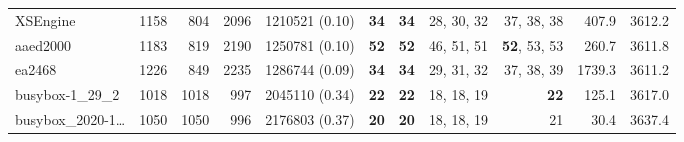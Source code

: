 \begin{table*}
\begin{tiny}
{{\begin{tabular}{lrrrrrrrrrr}
XSEngine & \num[text-series-to-math=true]{1158} & \num[text-series-to-math=true]{804} & \num[text-series-to-math=true]{2096} & \num[text-series-to-math=true]{1210521} (\num[text-series-to-math=true]{0.10}) & \textbf{\num[text-series-to-math=true]{34}} & \textbf{\num[text-series-to-math=true]{34}} & \num[text-series-to-math=true]{28}, \num[text-series-to-math=true]{30}, \num[text-series-to-math=true]{32} & \num[text-series-to-math=true]{37}, \num[text-series-to-math=true]{38}, \num[text-series-to-math=true]{38} & 407.9 & 3612.2\\
aaed2000 & \num[text-series-to-math=true]{1183} & \num[text-series-to-math=true]{819} & \num[text-series-to-math=true]{2190} & \num[text-series-to-math=true]{1250781} (\num[text-series-to-math=true]{0.10}) & \textbf{\num[text-series-to-math=true]{52}} & \textbf{\num[text-series-to-math=true]{52}} & \num[text-series-to-math=true]{46}, \num[text-series-to-math=true]{51}, \num[text-series-to-math=true]{51} & \textbf{\num[text-series-to-math=true]{52}}, \num[text-series-to-math=true]{53}, \num[text-series-to-math=true]{53} & 260.7 & 3611.8\\
ea2468 & \num[text-series-to-math=true]{1226} & \num[text-series-to-math=true]{849} & \num[text-series-to-math=true]{2235} & \num[text-series-to-math=true]{1286744} (\num[text-series-to-math=true]{0.09}) & \textbf{\num[text-series-to-math=true]{34}} & \textbf{\num[text-series-to-math=true]{34}} & \num[text-series-to-math=true]{29}, \num[text-series-to-math=true]{31}, \num[text-series-to-math=true]{32} & \num[text-series-to-math=true]{37}, \num[text-series-to-math=true]{38}, \num[text-series-to-math=true]{39} & 1739.3 & 3611.2\\
busybox-1\_29\_2 & \num[text-series-to-math=true]{1018} & \num[text-series-to-math=true]{1018} & \num[text-series-to-math=true]{997} & \num[text-series-to-math=true]{2045110} (\num[text-series-to-math=true]{0.34}) & \textbf{\num[text-series-to-math=true]{22}} & \textbf{\num[text-series-to-math=true]{22}} & \num[text-series-to-math=true]{18}, \num[text-series-to-math=true]{18}, \num[text-series-to-math=true]{19} & \textbf{\num[text-series-to-math=true]{22}} & 125.1 & 3617.0\\
busybox\_2020-1\ldots & \num[text-series-to-math=true]{1050} & \num[text-series-to-math=true]{1050} & \num[text-series-to-math=true]{996} & \num[text-series-to-math=true]{2176803} (\num[text-series-to-math=true]{0.37}) & \textbf{\num[text-series-to-math=true]{20}} & \textbf{\num[text-series-to-math=true]{20}} & \num[text-series-to-math=true]{18}, \num[text-series-to-math=true]{18}, \num[text-series-to-math=true]{19} & \num[text-series-to-math=true]{21} & 30.4 & 3637.4\\

\end{tabular}}}
\end{tiny}
\end{table*}
